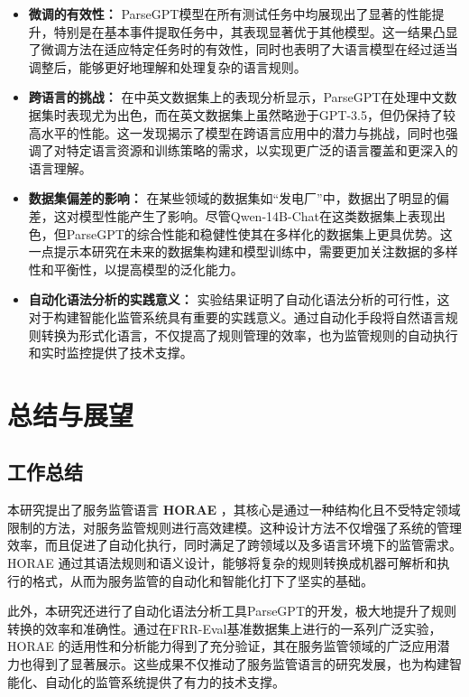 \begin{itemize}
    \item \textbf{微调的有效性：} ParseGPT模型在所有测试任务中均展现出了显著的性能提升，特别是在基本事件提取任务中，其表现显著优于其他模型。这一结果凸显了微调方法在适应特定任务时的有效性，同时也表明了大语言模型在经过适当调整后，能够更好地理解和处理复杂的语言规则。    
    \item \textbf{跨语言的挑战：} 在中英文数据集上的表现分析显示，ParseGPT在处理中文数据集时表现尤为出色，而在英文数据集上虽然略逊于GPT-3.5，但仍保持了较高水平的性能。这一发现揭示了模型在跨语言应用中的潜力与挑战，同时也强调了对特定语言资源和训练策略的需求，以实现更广泛的语言覆盖和更深入的语言理解。    
    \item \textbf{数据集偏差的影响：} 在某些领域的数据集如“发电厂”中，数据出了明显的偏差，这对模型性能产生了影响。尽管Qwen-14B-Chat在这类数据集上表现出色，但ParseGPT的综合性能和稳健性使其在多样化的数据集上更具优势。这一点提示本研究在未来的数据集构建和模型训练中，需要更加关注数据的多样性和平衡性，以提高模型的泛化能力。    
    \item \textbf{自动化语法分析的实践意义：} 实验结果证明了自动化语法分析的可行性，这对于构建智能化监管系统具有重要的实践意义。通过自动化手段将自然语言规则转换为形式化语言，不仅提高了规则管理的效率，也为监管规则的自动执行和实时监控提供了技术支撑。
\end{itemize}

\newpage

\section{总结与展望}

\subsection{工作总结}

本研究提出了服务监管语言 \textbf{HORAE} ，其核心是通过一种结构化且不受特定领域限制的方法，对服务监管规则进行高效建模。这种设计方法不仅增强了系统的管理效率，而且促进了自动化执行，同时满足了跨领域以及多语言环境下的监管需求。HORAE 通过其语法规则和语义设计，能够将复杂的规则转换成机器可解析和执行的格式，从而为服务监管的自动化和智能化打下了坚实的基础。

此外，本研究还进行了自动化语法分析工具ParseGPT的开发，极大地提升了规则转换的效率和准确性。通过在FRR-Eval基准数据集上进行的一系列广泛实验，HORAE 的适用性和分析能力得到了充分验证，其在服务监管领域的广泛应用潜力也得到了显著展示。这些成果不仅推动了服务监管语言的研究发展，也为构建智能化、自动化的监管系统提供了有力的技术支撑。

